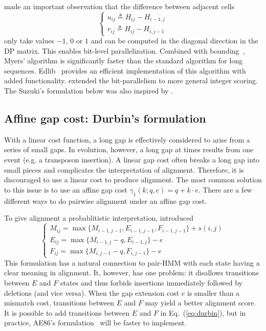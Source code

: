 \documentclass{bioinfo}
\begin{document}
\citet{Myers:1999aa} made an important observation that the difference between
adjacent cells
\[\left\{\begin{array}{l}
u_{ij}\triangleq H_{ij}-H_{i-1,j}\\
v_{ij}\triangleq H_{ij}-H_{i,j-1}
\end{array}\right.\]
only take values $-1$, $0$ or $1$ and can be computed in the diagonal direction
in the DP matrix. This enables bit-level parallelization. Combined with
bounding~\citep{Ukkonen:1985aa}, Myers' algorithm is significantly faster than
the standard algorithm for long sequences. Edlib~\citep{Sosic:2017aa} provides
an efficient implementation of this algorithm with added functionality.
\citet{Loving:2014aa} extended the bit-parallelism to more general integer
scoring. The Suzuki's formulation below was also inspired by
\citet{Myers:1999aa}.

\subsection{Affine gap cost: Durbin's formulation}

With a linear cost function, a long gap is effectively considered to arise from
a series of small gaps. In evolution, however, a long gap at times results from
one event (e.g. a transposon insertion). A linear gap cost often breaks a long
gap into small pieces and complicates the interpretation of alignment.
Therefore, it is discouraged to use a linear cost to produce alignment. The
most common solution to this issue is to use an affine gap cost
$\gamma_1(k;q,e)=q+k\cdot e$. There are a few different ways to do pairwise
alignment under an affine gap cost.

To give alignment a probablitistic interpretation, \citep{Durbin:1998uq} 
introduced
\begin{equation}\label{eq:durbin}
\left\{\begin{array}{l}
M_{ij}=\max\{M_{i-1,j-1}, E_{i-1,j-1}, F_{i-1,j-1}\} + s(i,j)\\
E_{ij}=\max\{M_{i-1,j}-q, E_{i-1,j}\} - e\\
F_{ij}=\max\{M_{i,j-1}-q, F_{i,j-1}\} - e
\end{array}\right.
\end{equation}
This formulation has a natural connection to pair-HMM with each state having a
clear meaning in alignment. It, however, has one problem: it disallows
transitions between $E$ and $F$ states and thus forbids insertions immediately
followed by deletions (and vice versa). When the gap extension cost $e$ is
smaller than a mismatch cost, transitions between $E$ and $F$ may yield a
better alignment score. It is possible to add transitions between $E$ and $F$
in Eq.~(\ref{eq:durbin}), but in practice, AE86's
formulation~\citep{Altschul:1986aa} will be faster to implement.
\end{document}
